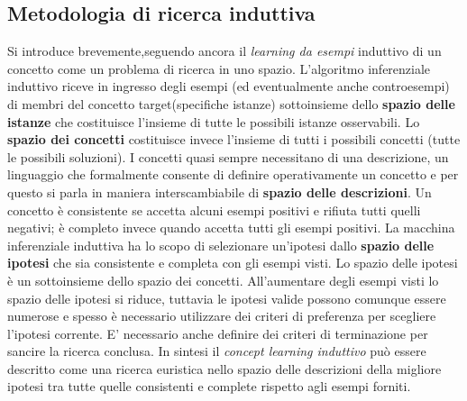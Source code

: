 \subsection{Metodologia di ricerca induttiva}
Si introduce brevemente,seguendo ancora \cite{Mic86a} il \textit{learning da esempi} induttivo di un concetto come un problema di ricerca in uno spazio. L'algoritmo inferenziale induttivo riceve in ingresso degli esempi (ed eventualmente anche controesempi) di membri del concetto target(specifiche istanze) sottoinsieme dello \textbf{spazio delle istanze} che costituisce l'insieme di tutte le possibili istanze osservabili. Lo \textbf{spazio dei concetti} costituisce invece l'insieme di tutti i possibili concetti (tutte le possibili soluzioni). I concetti quasi sempre necessitano di una descrizione, un linguaggio che formalmente consente di definire operativamente un concetto e per questo si parla in maniera interscambiabile di \textbf{spazio delle descrizioni}. Un concetto è consistente se accetta alcuni esempi positivi e rifiuta tutti quelli negativi; è completo invece quando accetta tutti gli esempi positivi. La macchina inferenziale induttiva ha lo scopo di selezionare un'ipotesi dallo \textbf{spazio delle ipotesi} che sia consistente e completa con gli esempi visti. Lo spazio delle ipotesi è un sottoinsieme dello spazio dei concetti. All'aumentare degli esempi visti lo spazio delle ipotesi si riduce, tuttavia le ipotesi valide possono comunque essere numerose e spesso è necessario utilizzare dei criteri di preferenza per scegliere l'ipotesi corrente. E' necessario anche definire dei criteri di terminazione per sancire la ricerca conclusa.  In sintesi il \textit{concept learning induttivo} può essere descritto come una ricerca euristica nello spazio delle descrizioni della migliore ipotesi tra tutte quelle consistenti e complete rispetto agli esempi forniti.
